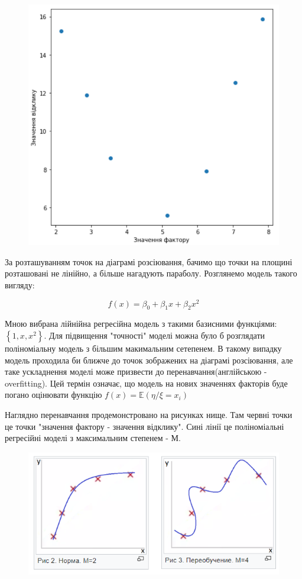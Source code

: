 \documentclass[a5paper, 20pt]{article}
\begin{document}
\begin{figure}[h]
\centering
\includegraphics[scale=0.54]{plot_for_first_task_1}
\centering
\end{figure}

За розташуванням точок на діаграмі розсіювання, бачимо що точки на площині розташовані не лінійно, а більше нагадують параболу. Розглянемо модель такого вигляду:

$$f(x) = \beta_0 + \beta_1 x + \beta_2 x^2$$

Мною вибрана лійнійна регресійна модель з такими базисними функціями: $\left\{1, x, x^2\right\}$. Для підвищення "точності" моделі можна було б розглядати поліноміальну модель з більшим макимальним сетепенем. В такому випадку модель проходила би ближче до точок зображених на діаграмі розсіювання, але таке ускладнення моделі може призвести до перенавчання(англійською - overfitting). Цей термін означає, що модель на нових значеннях факторів буде погано оцінювати функцію $f(x) = \mathbb{E}(\eta/\xi = x_i)$

\newpage{}

Наглядно перенавчання продемонстровано на рисунках нище. Там червні точки це точки "значення фактору - значення відклику". Сині лінії це поліноміальні регресійні моделі з максимальним степенем - М. 

\begin{figure}[h]
\centering
\includegraphics[scale=1]{overfitting_example}
\centering
\end{figure}
\end{document}
